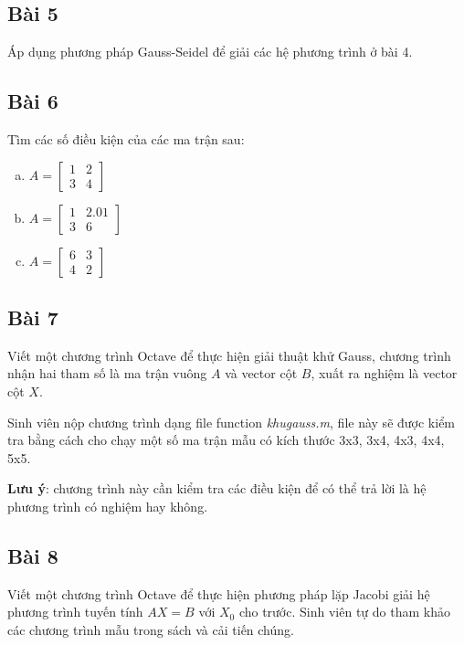 \documentclass[12pt]{article}
\begin{document}
\subsection{Bài 5}

Áp dụng phương pháp Gauss-Seidel để giải các hệ phương trình ở bài 4.

\subsection{Bài 6}

Tìm các số điều kiện của các ma trận sau:

\begin{enumerate}[a)]

\item $A = \begin{bmatrix}  1 & 2\\ 3 & 4 \end{bmatrix}$

\item $A = \begin{bmatrix} 1 & 2.01 \\ 3 & 6\end{bmatrix}$

\item $A = \begin{bmatrix} 6 & 3 \\ 4 & 2\end{bmatrix}$

\end{enumerate}

\subsection{Bài 7}
Viết một chương trình Octave để thực hiện giải thuật khử Gauss, chương trình nhận hai tham số là ma trận vuông $A$ và vector cột $B$, xuất ra nghiệm là vector cột $X$.

Sinh viên nộp chương trình dạng file function \emph{khugauss.m}, file này sẽ được kiểm tra bằng cách cho chạy một số ma trận mẫu có kích thước 3x3, 3x4, 4x3, 4x4, 5x5.

\textbf{Lưu ý}: chương trình này cần kiểm tra các điều kiện để có thể trả lời là hệ phương trình có nghiệm hay không.

\subsection{Bài 8}
Viết một chương trình Octave để thực hiện phương pháp lặp Jacobi giải hệ phương trình tuyến tính $AX=B$ với $X_0$ cho trước. Sinh viên tự do tham khảo các chương trình mẫu trong sách và cải tiến chúng.
\end{document}
